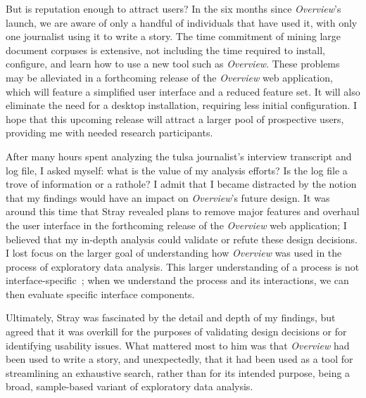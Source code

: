 But is reputation enough to attract users? In the six months since {\it Overview}'s launch, we are aware of only a handful of individuals that have used it, with only one journalist using it to write a story. 
The time commitment of mining large document corpuses is extensive, not including the time required to install, configure, and learn how to use a new tool such as {\it Overview}. 
These problems may be alleviated in a forthcoming release of the {\it Overview} web application, which will feature a simplified user interface and a reduced feature set. 
It will also eliminate the need for a desktop installation, requiring less initial configuration. 
I hope that this upcoming release will attract a larger pool of prospective users, providing me with  needed research participants.

After many hours spent analyzing the {\sc tulsa} journalist's interview transcript and log file, I asked myself: what is the value of my analysis efforts? 
Is the log file a trove of information or a rathole? 
I admit that I became distracted by the notion that my findings would have an impact on {\it Overview}'s future design. 
It was around this time that Stray revealed plans to remove major features and overhaul the user interface in the forthcoming release of the {\it Overview} web application; I believed that my in-depth analysis could validate or refute these design decisions. 
I lost focus on the larger goal of understanding how {\it Overview} was used in the process of exploratory data analysis. 
This larger understanding of a process is not interface-specific~\cite{Beaudouin-Lafon2004}; when we understand the process and its interactions, we can then evaluate specific interface components.

Ultimately, Stray was fascinated by the detail and depth of my findings, but agreed that it was overkill for the purposes of validating design decisions or for identifying usability issues. 
What mattered most to him was that {\it Overview} had been used to write a story, and unexpectedly, that it had been used as a tool for streamlining an exhaustive search, rather than for its intended purpose, being a broad, sample-based variant of exploratory data analysis.

